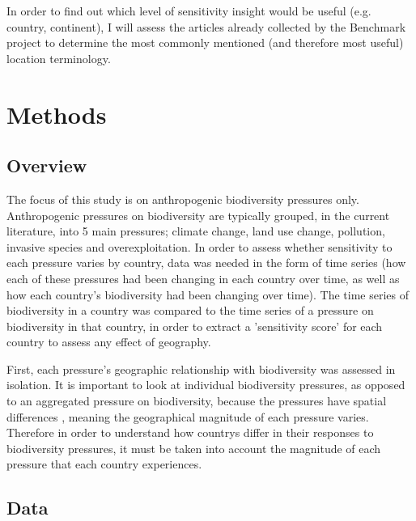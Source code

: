 \documentclass[11pt, a4paper, titlepage]{article}
\begin{document}
	In order to find out which level of sensitivity insight would be useful (e.g. country, continent), I will assess the articles already collected by the Benchmark project to determine the most commonly mentioned (and therefore most useful) location terminology.
	
	
   	\newpage

    \section*{Methods}
	\subsection*{Overview}

	The focus of this study is on anthropogenic biodiversity pressures only. Anthropogenic pressures on biodiversity are typically grouped, in the current literature, into 5 main pressures; climate change, land use change, pollution, invasive species and overexploitation. In order to assess whether sensitivity to each pressure varies by country, data was needed in the form of time series (how each of these pressures had been changing in each country over time, as well as how each country's biodiversity had been changing over time). The time series of biodiversity in a country was compared to the time series of a pressure on biodiversity in that country, in order to extract a 'sensitivity score' for each country to assess any effect of geography. \newline
	
	First, each pressure's geographic relationship with biodiversity was assessed in isolation. It is important to look at individual biodiversity pressures, as opposed to an aggregated pressure on biodiversity, because the pressures have spatial differences \citep{steffen2015planetary}, meaning the geographical magnitude of each pressure varies. Therefore in order to understand how countrys differ in their responses to biodiversity pressures, it must be taken into account the magnitude of each pressure that each country experiences. \newline
	\subsection*{Data}
	
\end{document}
